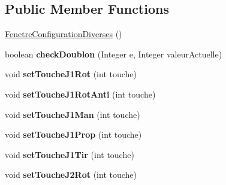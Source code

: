 \subsection*{Public Member Functions}
\begin{DoxyCompactItemize}
\item 
\hyperlink{class_interface_graphique_1_1_fenetre_configuration_diverses_a476caf795e2528a6fa818e0a3007b6db}{Fenetre\-Configuration\-Diverses} ()
\item 
\hypertarget{class_interface_graphique_1_1_fenetre_configuration_diverses_a06f5a9d5cb4823955aedbabf38b2e72b}{boolean {\bfseries check\-Doublon} (Integer e, Integer valeur\-Actuelle)}\label{class_interface_graphique_1_1_fenetre_configuration_diverses_a06f5a9d5cb4823955aedbabf38b2e72b}

\item 
\hypertarget{class_interface_graphique_1_1_fenetre_configuration_diverses_a824b8586effdc433dcc4eb050c1967fa}{void {\bfseries set\-Touche\-J1\-Rot} (int touche)}\label{class_interface_graphique_1_1_fenetre_configuration_diverses_a824b8586effdc433dcc4eb050c1967fa}

\item 
\hypertarget{class_interface_graphique_1_1_fenetre_configuration_diverses_a1368d63404611c0e099a879ed3c59c57}{void {\bfseries set\-Touche\-J1\-Rot\-Anti} (int touche)}\label{class_interface_graphique_1_1_fenetre_configuration_diverses_a1368d63404611c0e099a879ed3c59c57}

\item 
\hypertarget{class_interface_graphique_1_1_fenetre_configuration_diverses_ad48ef33a074eff0fb20e7ced7d8e9571}{void {\bfseries set\-Touche\-J1\-Man} (int touche)}\label{class_interface_graphique_1_1_fenetre_configuration_diverses_ad48ef33a074eff0fb20e7ced7d8e9571}

\item 
\hypertarget{class_interface_graphique_1_1_fenetre_configuration_diverses_a7f8f35410a4b4055613f043ebbdb1575}{void {\bfseries set\-Touche\-J1\-Prop} (int touche)}\label{class_interface_graphique_1_1_fenetre_configuration_diverses_a7f8f35410a4b4055613f043ebbdb1575}

\item 
\hypertarget{class_interface_graphique_1_1_fenetre_configuration_diverses_aa5fde8ce18a8bbe6e09849e4cf363085}{void {\bfseries set\-Touche\-J1\-Tir} (int touche)}\label{class_interface_graphique_1_1_fenetre_configuration_diverses_aa5fde8ce18a8bbe6e09849e4cf363085}

\item 
\hypertarget{class_interface_graphique_1_1_fenetre_configuration_diverses_a612fee2b4384d7c9c0ac4ff9133ccc6c}{void {\bfseries set\-Touche\-J2\-Rot} (int touche)}\label{class_interface_graphique_1_1_fenetre_configuration_diverses_a612fee2b4384d7c9c0ac4ff9133ccc6c}


\end{DoxyCompactItemize}
